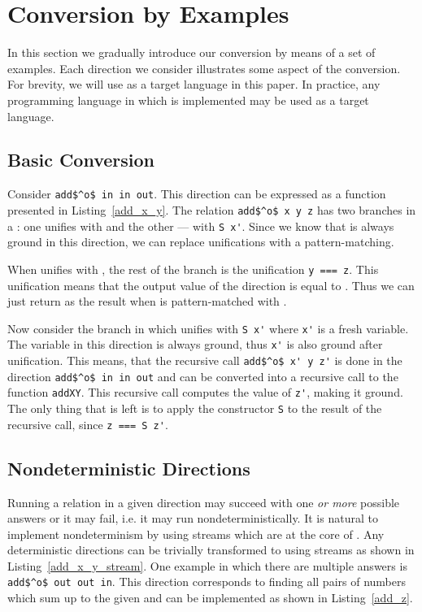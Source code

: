 \section{Conversion by Examples}

In this section we gradually introduce our conversion by means of a set of examples.
Each direction we consider illustrates some aspect of the conversion.
For brevity, we will use \haskell as a target language in this paper.
In practice, any programming language in which \mk is implemented may be used as a target language.


\subsection{Basic Conversion}

Consider \lstinline{add$^o$ in in out}.
This direction can be expressed as a function presented in Listing~\ref{add_x_y}.
The relation \lstinline{add$^o$ x y z} has two branches in a \conde: one unifies \x with \zero and the other --- with \lstinline{S x'}.
Since we know that \x is always ground in this direction, we can replace unifications with a pattern-matching.

When \x unifies with \zero, the rest of the \conde branch is the unification \lstinline{y === z}.
This unification means that the output value of the direction is equal to \y.
Thus we can just return \y as the result when \x is pattern-matched with \zero.

Now consider the \conde branch in which \x unifies with \lstinline{S x'} where \lstinline{x'} is a fresh variable.
The variable \x in this direction is always ground, thus \lstinline{x'} is also ground after unification.
This means, that the recursive call \lstinline{add$^o$ x' y z'} is done in the direction \lstinline{add$^o$ in in out} and can be converted into a recursive call to the function \lstinline{addXY}.
This recursive call computes the value of \lstinline{z'}, making it ground.
The only thing that is left is to apply the constructor \lstinline{S} to the result of the recursive call, since \lstinline{z === S z'}.




\subsection{Nondeterministic Directions}

Running a relation in a given direction may succeed with one \emph{or more} possible answers or it may fail, i.e. it may run nondeterministically.
It is natural to implement nondeterminism by using streams which are at the core of \mk.
Any deterministic directions can be trivially transformed to using streams as shown in Listing~\ref{add_x_y_stream}.
One example in which there are multiple answers is \lstinline{add$^o$ out out in}.
This direction corresponds to finding all pairs of numbers which sum up to the given \z and can be implemented as shown in Listing~\ref{add_z}.


